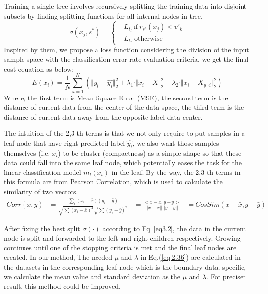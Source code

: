 \documentclass[master]{IPSstyle}
\begin{document}
{Training a single tree involves recursively splitting the training data into disjoint subsets by finding splitting functions for all internal nodes in tree.
\begin{equation} \label{eq3.1}
\sigma(x_j, s^*) = 
\left\{ \begin{aligned}
&L_{t_l} ~ \text{if} ~ r_{s^*}(x_j) < v'_k \\
&L_{t_r} ~ \text{otherwise}
\end{aligned} \right.
\end{equation}
Inspired by them, we propose a loss function considering the division of the input sample space with the classification error rate evaluation criteria, we get the final cost equation as below:
\begin{equation} \label{eq3.2}
E(x_i) = \frac{1}{N}\sum_{n=1}^{N}\left(\Vert y_i - \hat{y_i}\Vert_2^2 + \lambda_1 \cdot \Vert x_i - \bar{X}\Vert_2^2 + \lambda_2 \cdot \Vert x_i - \bar{X}_{y\neg i}\Vert_2^2\right)
\end{equation}
Where, the first term is Mean Square Error (MSE), the second term is the distance of current data from the center of the data space, the third term is the distance of current data away from the opposite label data center.

The intuition of the 2,3-th terms is that we not only require to put samples in a leaf node that have right predicted label $\hat{y_i}$, we also want those samples themselves (i.e. $x_i$) to be cluster (compactness) as a simple shape so that these data could fall into the same leaf node, which potentially eases the task for the linear classification model $m_l(x_i)$ in the leaf.
By the way, the 2,3-th terms in this formula are from Pearson Correlation, which is used to calculate the similarity of two vectors.
\begin{align}
Corr(x, y) &=  \frac{\sum_i(x_i - \bar{x})(y_i - \bar{y})}{\sqrt{\sum(x_i-\bar{x})^2}\sqrt{\sum(y_i - \bar{y})^2}}
&= \frac{<x - \bar{x}, y - \bar{y}>}{||x-\bar{x}||||y- \bar{y}||}
&= CosSim(x-\bar{x}, y- \bar{y}) 
\end{align}

After fixing the best split $\sigma(\cdot)$ according to Eq~\ref{eq3.2}, the data in the current node is split and forwarded to the left and right children respectively. Growing continues until one of the stopping criteria is met and the final leaf nodes are created. In our method, The needed $\mu$ and $\lambda$ in Eq.(\ref{eq:2.36}) are calculated in the datasets in the corresponding leaf node which is the boundary data, specific, we calculate the mean value and standard deviation as the $\mu$ and $\lambda$. For preciser result, this method could be improved.

}
\end{document}
